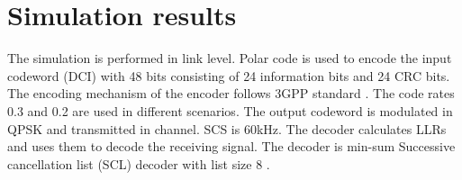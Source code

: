 \documentclass[conference,10pt]{IEEEtran}
\begin{document}

\section{Simulation results}

The simulation is performed in link level. Polar code is used to encode the input codeword (DCI) with 48 bits consisting of 24 information bits and 24 CRC bits. The encoding mechanism of the encoder follows 3GPP standard \cite{b8}. The code rates 0.3 and 0.2 are used in different scenarios. The output codeword is modulated in QPSK and transmitted in channel. SCS is 60kHz. The decoder calculates LLRs and uses them to decode the receiving signal. The decoder is min-sum Successive cancellation list (SCL) decoder with list size 8 \cite{b9}.
\end{document}
